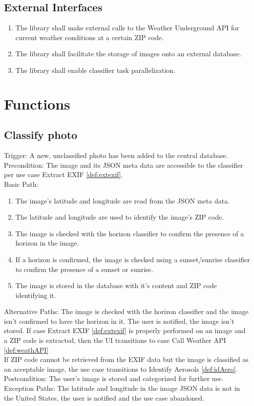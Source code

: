 \documentclass[journal,10pt,draftclsnofoot,onecolumn]{IEEEtran}
\begin{document}
\begin{singlespace}
	\subsection{External Interfaces}
		\begin{enumerate}
			\item The library shall make external calls to the Weather Underground API \cite{api_weather_underground} for current weather conditions at a certain ZIP code.
			\item The library shall facilitate the storage of images onto an external database.
			\item The library shall enable classifier task parallelization.
		\end{enumerate}
\clearpage

\section{Functions}
	\subsection{Classify photo} \label{def:classPh}
		Trigger: A new, unclassified photo has been added to the central database.\\
		Precondition: The image and its JSON meta data are accessible to the classifier per use case Extract EXIF \ref{def:extexif}.\\
		Basic Path:
		\begin{enumerate}
			\item The image's latitude and longitude are read from the JSON meta data.
			\item The latitude and longitude are used to identify the image's ZIP code.
			\item The image is checked with the horizon classifier to confirm the presence of a horizon in the image.
			\item If a horizon is confirmed, the image is checked using a sunset/sunrise classifier to confirm the presence of a sunset or sunrise.
			\item The image is stored in the database with it's content and ZIP code identifying it.
		\end{enumerate}
		Alternative Paths: The image is checked with the horizon classifier and the image isn't confirmed to have the horizon in it. The user is notified, the image isn't stored. If case Extract EXIF \ref{def:extexif} is properly performed on an image and a ZIP code is extracted, then the UI transitions to case Call Weather API \ref{def:weathAPI}\\
		If ZIP code cannot be retrieved from the EXIF data but the image is classified as an acceptable image, the use case transitions to Identify Aerosols \ref{def:idAero}.\\
		Postcondition: The user's image is stored and categorized for further use.\\
		Exception Paths: The latitude and longitude in the image JSON data is not in the United States, the user is notified and the use case abandoned. 
	

\end{singlespace}
\end{document}
